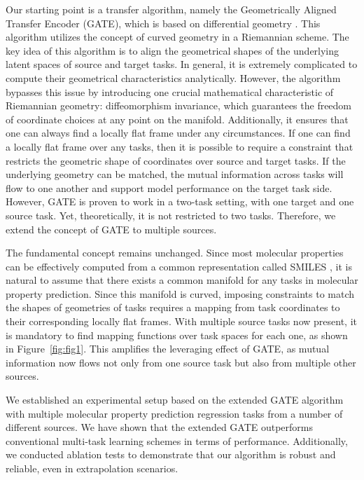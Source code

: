 Our starting point is a transfer algorithm, namely the Geometrically Aligned Transfer Encoder (GATE), which is based on differential geometry \cite{ko2023geometrically}. This algorithm utilizes the concept of curved geometry in a Riemannian scheme. The key idea of this algorithm is to align the geometrical shapes of the underlying latent spaces of source and target tasks. In general, it is extremely complicated to compute their geometrical characteristics analytically. However, the algorithm bypasses this issue by introducing one crucial mathematical characteristic of Riemannian geometry: diffeomorphism invariance, which guarantees the freedom of coordinate choices at any point on the manifold. Additionally, it ensures that one can always find a locally flat frame under any circumstances. If one can find a locally flat frame over any tasks, then it is possible to require a constraint that restricts the geometric shape of coordinates over source and target tasks. If the underlying geometry can be matched, the mutual information across tasks will flow to one another and support model performance on the target task side. However, GATE is proven to work in a two-task setting, with one target and one source task. Yet, theoretically, it is not restricted to two tasks. Therefore, we extend the concept of GATE to multiple sources.

The fundamental concept remains unchanged. Since most molecular properties can be effectively computed from a common representation called SMILES \cite{weininger1988smiles}, it is natural to assume that there exists a common manifold for any tasks in molecular property prediction. Since this manifold is curved, imposing constraints to match the shapes of geometries of tasks requires a mapping from task coordinates to their corresponding locally flat frames. With multiple source tasks now present, it is mandatory to find mapping functions over task spaces for each one, as shown in Figure~\ref{fig:fig1}. This amplifies the leveraging effect of GATE, as mutual information now flows not only from one source task but also from multiple other sources.

We established an experimental setup based on the extended GATE algorithm with multiple molecular property prediction regression tasks from a number of different sources. We have shown that the extended GATE outperforms conventional multi-task learning schemes in terms of performance. Additionally, we conducted ablation tests to demonstrate that our algorithm is robust and reliable, even in extrapolation scenarios.

